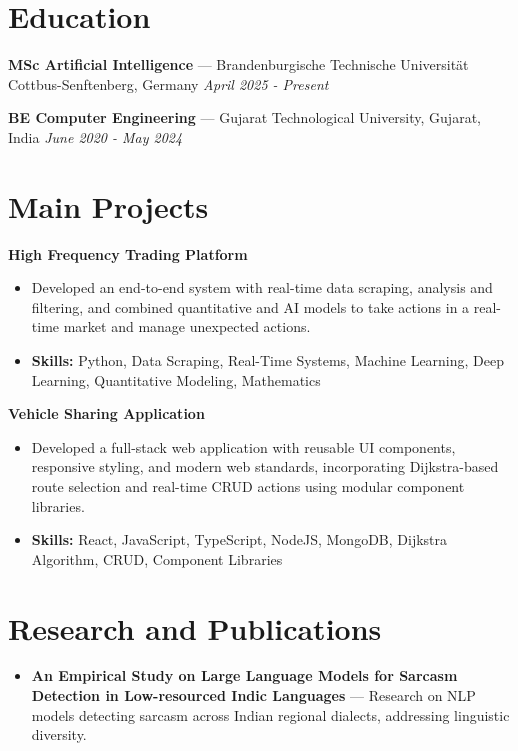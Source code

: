 \documentclass[a4paper,10pt]{article}
\begin{document}
\section*{Education}
\textbf{MSc Artificial Intelligence} — Brandenburgische Technische Universität Cottbus-Senftenberg, Germany \hfill \textit{April 2025 - Present}\par
\vspace{1.5pt}
\textbf{BE Computer Engineering} — Gujarat Technological University, Gujarat, India \hfill \textit{June 2020 - May 2024}\par

\section*{Main Projects}
\textbf{High Frequency Trading Platform}\par
\vspace{1pt}
\begin{itemize}
  \item Developed an end-to-end system with real-time data scraping, analysis and filtering, and combined quantitative and AI models to take actions in a real-time market and manage unexpected actions.
  \item \textbf{Skills:} Python, Data Scraping, Real-Time Systems, Machine Learning, Deep Learning, Quantitative Modeling, Mathematics
\end{itemize}
\vspace{3pt}
\textbf{Vehicle Sharing Application}\par
\vspace{1pt}
\begin{itemize}
  \item Developed a full-stack web application with reusable UI components, responsive styling, and modern web standards, incorporating Dijkstra-based route selection and real-time CRUD actions using modular component libraries.
  \item \textbf{Skills:} React, JavaScript, TypeScript, NodeJS, MongoDB, Dijkstra Algorithm, CRUD, Component Libraries
\end{itemize}

\section*{Research and Publications}
\begin{itemize}
\item \textbf{An Empirical Study on Large Language Models for Sarcasm Detection in Low-resourced Indic Languages} — Research on NLP models detecting sarcasm across Indian regional dialects, addressing linguistic diversity.
\end{itemize}
\end{document}
